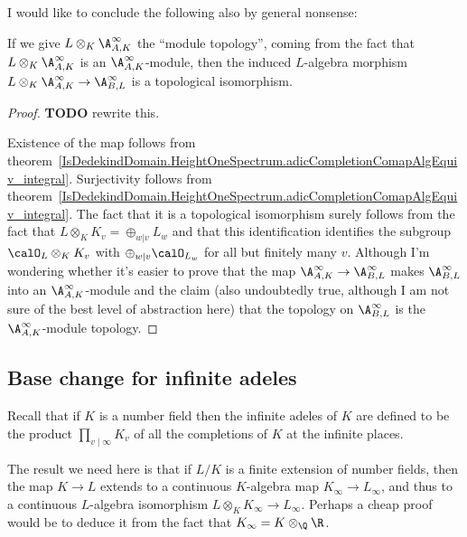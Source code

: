 I would like to conclude the following also by general nonsense:

\begin{theorem}
  \label{IsDedekindDomain.FiniteAdeleRing.baseChangeAlgEquiv}
  \leanok
  If we give $L\otimes_K\A_{A,K}^\infty$ the ``module topology'', coming from the fact
  that $L\otimes_K\A_{A,K}^\infty$ is an $\A_{A,K}^\infty$-module, then the induced
  $L$-algebra morphism
  $L\otimes_K\A_{A,K}^\infty\to\A_{B,L}^\infty$ is a topological isomorphism.
\end{theorem}
\begin{proof}
  {\bf TODO} rewrite this.

  Existence of the map follows from
  theorem~\ref{IsDedekindDomain.HeightOneSpectrum.adicCompletionComapAlgEquiv_integral}.
  Surjectivity follows from
  theorem~\ref{IsDedekindDomain.HeightOneSpectrum.adicCompletionComapAlgEquiv_integral}.
  The fact that it is a topological isomorphism surely follows from the fact that
  $L\otimes_K K_v=\oplus_{w|v}L_w$ and that this identification identifies
  the subgroup $\calO_L\otimes_K K_v$ with $\oplus_{w|v}\calO_{L_w}$ for all
  but finitely many $v$. Although I'm wondering whether it's easier to prove
  that the map $\A_{A,K}^\infty\to\A_{B,L}^\infty$ makes $\A_{B,L}^\infty$
  into an $\A_{A,K}^\infty$-module and the claim (also undoubtedly true, although
  I am not sure of the best level of abstraction here) that the topology on
  $\A_{B,L}^\infty$ is the $\A_{A,K}^\infty$-module topology.
\end{proof}

\subsection{Base change for infinite adeles}

Recall that if $K$ is a number field then the infinite adeles of $K$ are defined
to be the product $\prod_{v\mid\infty} K_v$ of all the completions of $K$ at the
infinite places.

The result we need here is that if $L/K$ is a finite extension of number fields,
then the map $K\to L$ extends to a continuous $K$-algebra map $K_\infty\to L_\infty$,
and thus to a continuous $L$-algebra isomorphism $L\otimes_KK_\infty\to L_\infty$.
Perhaps a cheap proof would be to deduce it from the fact that $K_\infty=K\otimes_{\Q}\R$.

